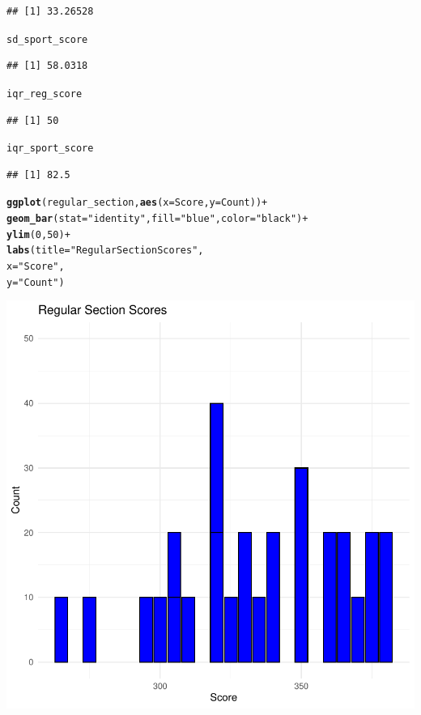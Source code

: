 \documentclass{article}\usepackage[]{graphicx}\usepackage[]{xcolor}
\makeatletter
\newcommand{\hlnum}[1]{\textcolor[rgb]{0.686,0.059,0.569}{#1}}%
\newcommand{\hlstr}[1]{\textcolor[rgb]{0.192,0.494,0.8}{#1}}%
\newcommand{\hlopt}[1]{\textcolor[rgb]{0,0,0}{#1}}%
\newcommand{\hlstd}[1]{\textcolor[rgb]{0.345,0.345,0.345}{#1}}%
\newcommand{\hlkwc}[1]{\textcolor[rgb]{0.333,0.667,0.333}{#1}}%
\newcommand{\hlkwd}[1]{\textcolor[rgb]{0.737,0.353,0.396}{\textbf{#1}}}%
\newenvironment{kframe}{%
 \def\at@end@of@kframe{}%
 \ifinner\ifhmode%
  \def\at@end@of@kframe{\end{minipage}}%
  \begin{minipage}{\columnwidth}%
 \fi\fi%
 \def\FrameCommand##1{\hskip\@totalleftmargin \hskip-\fboxsep
 \colorbox{shadecolor}{##1}\hskip-\fboxsep
     \hskip-\linewidth \hskip-\@totalleftmargin \hskip\columnwidth}%
 \MakeFramed {\advance\hsize-\width
   \@totalleftmargin\z@ \linewidth\hsize
   \@setminipage}}%
 {\par\unskip\endMakeFramed%
 \at@end@of@kframe}
\newenvironment{knitrout}{}{} %
\makeatother
\begin{document}
\begin{knitrout}
\begin{kframe}
\begin{verbatim}
## [1] 33.26528
\end{verbatim}
\begin{alltt}
\hlstd{sd_sport_score}
\end{alltt}
\begin{verbatim}
## [1] 58.0318
\end{verbatim}
\begin{alltt}
\hlstd{iqr_reg_score}
\end{alltt}
\begin{verbatim}
## [1] 50
\end{verbatim}
\begin{alltt}
\hlstd{iqr_sport_score}
\end{alltt}
\begin{verbatim}
## [1] 82.5
\end{verbatim}
\begin{alltt}
\hlkwd{ggplot}\hlstd{(regular_section,} \hlkwd{aes}\hlstd{(}\hlkwc{x} \hlstd{= Score,} \hlkwc{y} \hlstd{= Count))} \hlopt{+}
  \hlkwd{geom_bar}\hlstd{(}\hlkwc{stat} \hlstd{=}\hlstr{"identity"}\hlstd{,} \hlkwc{fill} \hlstd{=}\hlstr{"blue"}\hlstd{,} \hlkwc{color} \hlstd{=} \hlstr{"black"}\hlstd{)} \hlopt{+}
  \hlkwd{ylim}\hlstd{(}\hlnum{0}\hlstd{,}\hlnum{50}\hlstd{)}\hlopt{+}
  \hlkwd{labs}\hlstd{(}\hlkwc{title} \hlstd{=} \hlstr{"Regular Section Scores"}\hlstd{,}
       \hlkwc{x} \hlstd{=} \hlstr{"Score"}\hlstd{,}
       \hlkwc{y} \hlstd{=} \hlstr{"Count"}\hlstd{)}
\end{alltt}
\end{kframe}

{\centering \includegraphics[width=.6\linewidth]{figure/assignment-4-1-Reppeto-Brian-Rnwauto-report-1} 

}



\end{knitrout}
\end{document}
